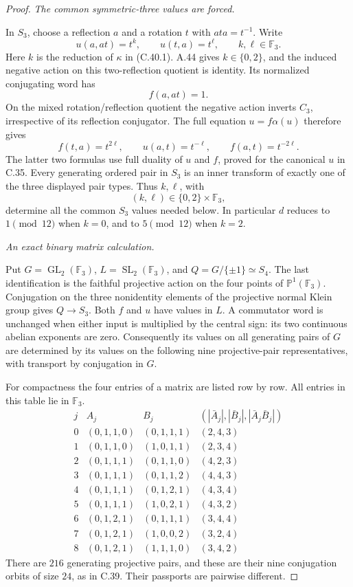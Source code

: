 \begin{proof}
\emph{The common symmetric-three values are forced.}\par
In \(S_3\), choose a reflection \(a\) and a rotation \(t\)
with \(ata=t^{-1}\). Write
\[
       u(a,at)=t^k,\qquad u(t,a)=t^\ell,\qquad
                  k,\ell\in\mathbb F_3.
\]
Here \(k\) is the reduction of \(\kappa\) in (C.40.1).
A.44 gives \(k\in\{0,2\}\), and the induced negative action
on this two-reflection quotient is identity. Its normalized
conjugating word has
\[
                          f(a,at)=1.
\]
On the mixed rotation/reflection quotient the negative action
inverts \(C_3\), irrespective of its reflection conjugator.
The full equation \(u=f\alpha(u)\) therefore gives
\[
 f(t,a)=t^{2\ell},\qquad
 u(a,t)=t^{-\ell},\qquad f(a,t)=t^{-2\ell}.
 \tag{C.40.3}
\]
The latter two formulas use full duality of \(u\) and \(f\),
proved for the canonical \(u\) in C.35. Every generating
ordered pair in \(S_3\) is an inner transform of exactly one
of the three displayed pair types. Thus \(k,\ell\), with
\[
              (k,\ell)\in\{0,2\}\times\mathbb F_3,
 \tag{C.40.4}
\]
determine all the common \(S_3\) values needed below.
In particular \(d\) reduces to \(1\pmod{12}\) when \(k=0\),
and to \(5\pmod{12}\) when \(k=2\).

\emph{An exact binary matrix calculation.}\par
Put \(G=\operatorname{GL}_2(\mathbb F_3)\),
\(L=\operatorname{SL}_2(\mathbb F_3)\), and
\(Q=G/\{\pm1\}\simeq S_4\). The last identification is
the faithful projective action on the four points of
\(\mathbb P^1(\mathbb F_3)\). Conjugation on the three
nonidentity elements of the projective normal Klein group
gives \(Q\to S_3\). Both \(f\) and \(u\) have values in
\(L\). A commutator word is unchanged when either input
is multiplied by the central sign: its two continuous
abelian exponents are zero. Consequently its values on
all generating pairs of \(G\) are determined by its values
on the following nine projective-pair representatives,
with transport by conjugation in \(G\).

For compactness the four entries of a matrix are listed
row by row. All entries in this table lie in \(\mathbb F_3\).
\[
\begin{array}{c|c|c|c}
j&A_j&B_j&(|\bar A_j|,|\bar B_j|,|\bar A_j\bar B_j|)\\ \hline
0&(0,1,1,0)&(0,1,1,1)&(2,4,3)\\
1&(0,1,1,0)&(1,0,1,1)&(2,3,4)\\
2&(0,1,1,1)&(0,1,1,0)&(4,2,3)\\
3&(0,1,1,1)&(0,1,1,2)&(4,4,3)\\
4&(0,1,1,1)&(0,1,2,1)&(4,3,4)\\
5&(0,1,1,1)&(1,0,2,1)&(4,3,2)\\
6&(0,1,2,1)&(0,1,1,1)&(3,4,4)\\
7&(0,1,2,1)&(1,0,0,2)&(3,2,4)\\
8&(0,1,2,1)&(1,1,1,0)&(3,4,2)
\end{array}
 \tag{C.40.5}
\]
There are \(216\) generating projective pairs, and these
are their nine conjugation orbits of size \(24\), as in
C.39. Their passports are pairwise different.


\end{proof}
